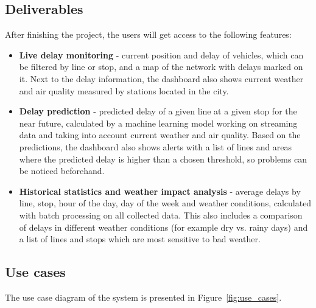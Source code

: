 \documentclass[11pt]{article}
\begin{document}
\subsection{Deliverables}

After finishing the project, the users will get access to the following features:
\begin{itemize}
    \item \textbf{Live delay monitoring} - current position and delay of vehicles, which can be filtered by line or stop, and a map of the network with delays marked on it. Next to the delay information, the dashboard also shows current weather and air quality measured by stations located in the city.
    \item \textbf{Delay prediction} - predicted delay of a given line at a given stop for the near future, calculated by a machine learning model working on streaming data and taking into account current weather and air quality. Based on the predictions, the dashboard also shows alerts with a list of lines and areas where the predicted delay is higher than a chosen threshold, so problems can be noticed beforehand.
    \item \textbf{Historical statistics and weather impact analysis} - average delays by line, stop, hour of the day, day of the week and weather conditions, calculated with batch processing on all collected data. This also includes a comparison of delays in different weather conditions (for example dry vs. rainy days) and a list of lines and stops which are most sensitive to bad weather.
\end{itemize}

\subsection{Use cases}

The use case diagram of the system is presented in Figure~\ref{fig:use_cases}.
\end{document}
